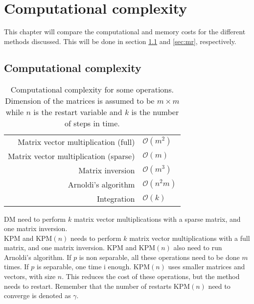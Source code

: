 \chapter{Computational complexity}%
\label{sec:comp}
This chapter will compare the computational and memory costs for the different methods discussed. This will be done in section \ref{sec:cc} and \ref{sec:mr}, respectively.
\section{Computational complexity} \label{sec:cc}
\begin{table}[H]
\centering
\begin{tabular}{r | l}
 Matrix vector multiplication (full) & $\mathcal{O}(m^2)$ \cite{complex} \\
 Matrix vector multiplication (sparse) & $\mathcal{O}(m)$ \cite{complex} \\
 Matrix inversion  & $ \mathcal{O}(m^3)$ \cite{complex} \\
 Arnoldi's algorithm & $ \mathcal{O}(n^2 m)$ \cite{saad} \\
 Integration & $\mathcal{O}(k)$
\end{tabular}
\caption{Computational complexity for some operations. Dimension of the matrices is assumed to be $m \times m$ while $n$ is the restart variable and $k$ is the number of steps in time.}
\label{tab:runtime}
\end{table}
DM need to perform $k$ matrix vector multiplications with a sparse matrix, and one matrix inversion. \\

KPM and KPM$(n)$ needs to perform $k$ matrix vector multiplications with a full matrix, and one matrix inversion. KPM and KPM$(n)$ also need to run Arnoldi's algorithm. If $p$ is non separable, all these operations need to be done $m$ times. If $p$ is separable, one time i enough. KPM$(n)$ uses smaller matrices and vectors, with size $n$. This reduces the cost of these operations, but the method needs to restart. Remember that the number of restarts KPM$(n)$ need to converge is denoted as  $\gamma$.\\ %

